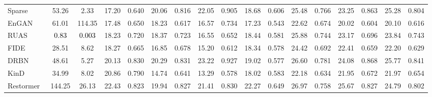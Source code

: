 \documentclass[10pt,twocolumn,letterpaper]{article}
\begin{document}
\begin{table*}[t]
{\begin{tabular}{l|cc|cc|cc|cc|cc|cc|cc|cc}
			Sparse~\cite{lol_v2}     &53.26 &2.33   &17.20  &0.640  &20.06  &0.816   &22.05    &0.905     &18.68 &0.606 &25.48 &0.766 &23.25 &0.863 &25.28 &0.804 \\
			
			EnGAN~\cite{enlightengan}  &61.01  &114.35  &17.48  &0.650    &18.23  &0.617   &16.57   &0.734  &17.23 &0.543  &22.62 &0.674 &20.02 &0.604 &20.10 &0.616\\
			
			RUAS~\cite{ruas}     &\textcolor{black}{0.83} &\textcolor{black}{0.003}   &18.23  &0.720  &18.37  &0.723   &16.55    &0.652    &18.44 &0.581 &25.88 &0.744 &23.17 &0.696 &23.84 &0.743 \\
			
			
FIDE~\cite{fide}     &28.51 &8.62   & 18.27  &0.665  &16.85  &0.678   &15.20    &0.612    &18.34 &0.578 &24.42 &0.692 &22.41 &0.659 &22.20 &0.629 \\
			
			DRBN~\cite{drbn} &48.61  &5.27   & 20.13   & 0.830    &20.29   & 0.831    & 23.22     & 0.927   &19.02 &0.577  &26.60 &0.781  &24.08  &0.868 &25.77 &0.841\\
			
			KinD~\cite{kind} &34.99    &8.02   &20.86 &0.790  &14.74 &0.641  &13.29 &0.578  &18.02 &0.583 &22.18 &0.634 &21.95 &0.672 &21.97 &0.654 \\
			
			
			Restormer~\cite{restormer}   &144.25 &26.13   &22.43        &0.823        &19.94         &0.827         &21.41      &0.830         &22.27 &0.649 &26.97 &0.758 &25.67 &0.827 &24.79 &0.802 \\
			

\end{tabular}}
\end{table*}
\end{document}
